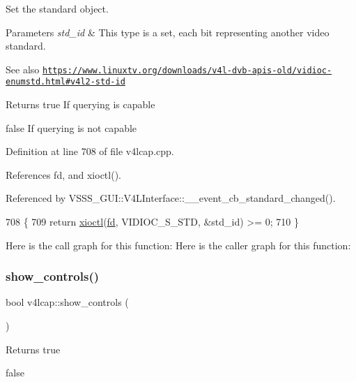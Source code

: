 Set the standard object. 


\begin{DoxyParams}{Parameters}
{\em std\+\_\+id} & This type is a set, each bit representing another video standard. \\
\hline
\end{DoxyParams}
\begin{DoxySeeAlso}{See also}
\href{https://www.linuxtv.org/downloads/v4l-dvb-apis-old/vidioc-enumstd.html#v4l2-std-id}{\tt https\+://www.\+linuxtv.\+org/downloads/v4l-\/dvb-\/apis-\/old/vidioc-\/enumstd.\+html\#v4l2-\/std-\/id} 
\end{DoxySeeAlso}
\begin{DoxyReturn}{Returns}
true If querying is capable 

false If querying is not capable 
\end{DoxyReturn}


Definition at line 708 of file v4lcap.\+cpp.



References fd, and xioctl().



Referenced by V\+S\+S\+S\+\_\+\+G\+U\+I\+::\+V4\+L\+Interface\+::\+\_\+\+\_\+event\+\_\+cb\+\_\+standard\+\_\+changed().


\begin{DoxyCode}
708                                             \{
709     \textcolor{keywordflow}{return} \hyperlink{classv4lcap_ab5aaa5a8c0df17f5ca57e0b5170232cb}{xioctl}(\hyperlink{classv4lcap_a38109593bde997dad13b3a461569573d}{fd}, VIDIOC\_S\_STD, &std\_id) >= 0;
710 \}
\end{DoxyCode}
Here is the call graph for this function\+:
Here is the caller graph for this function\+:
\mbox{\label{classv4lcap_a240c44f236eac63c0e76c81473170ef9}} 
\subsubsection{\texorpdfstring{show\+\_\+controls()}{show\_controls()}}
{\footnotesize\ttfamily bool v4lcap\+::show\+\_\+controls (\begin{DoxyParamCaption}{ }\end{DoxyParamCaption})}

\begin{DoxyReturn}{Returns}
true 

false 
\end{DoxyReturn}


